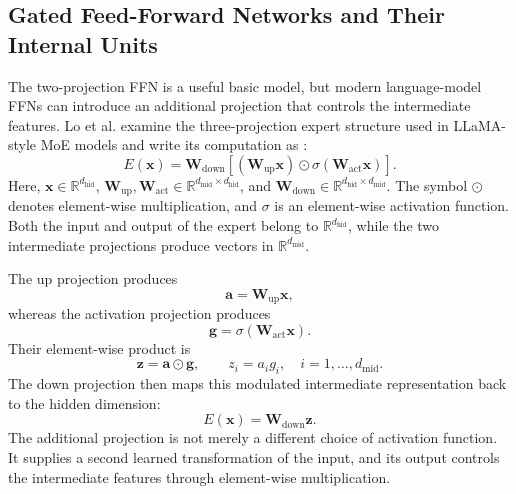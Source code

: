 \subsection{Gated Feed-Forward Networks and Their Internal Units}
\label{subsec:ffn-gated}

The two-projection FFN is a useful basic model, but modern language-model
FFNs can introduce an additional projection that controls the
intermediate features. Lo et al. examine the three-projection expert
structure used in LLaMA-style MoE models and write its computation as
\parencite{lo2025closer}:
\begin{equation}
    E(\mathbf{x})
    =
    \mathbf{W}_{\mathrm{down}}
    \left[
        \left(\mathbf{W}_{\mathrm{up}}\mathbf{x}\right)
        \odot
        \sigma\left(\mathbf{W}_{\mathrm{act}}\mathbf{x}\right)
    \right].
    \label{eq:ffn-gated}
\end{equation}
Here, \(\mathbf{x}\in\mathbb{R}^{d_{\mathrm{hid}}}\),
\(\mathbf{W}_{\mathrm{up}},\mathbf{W}_{\mathrm{act}}
\in\mathbb{R}^{d_{\mathrm{mid}}\times d_{\mathrm{hid}}}\), and
\(\mathbf{W}_{\mathrm{down}}
\in\mathbb{R}^{d_{\mathrm{hid}}\times d_{\mathrm{mid}}}\).
The symbol \(\odot\) denotes element-wise multiplication, and
\(\sigma\) is an element-wise activation function. Both the input and
output of the expert belong to \(\mathbb{R}^{d_{\mathrm{hid}}}\), while
the two intermediate projections produce vectors in
\(\mathbb{R}^{d_{\mathrm{mid}}}\).

The up projection produces
\begin{equation}
    \mathbf{a}
    =
    \mathbf{W}_{\mathrm{up}}\mathbf{x},
    \label{eq:ffn-gated-up}
\end{equation}
whereas the activation projection produces
\begin{equation}
    \mathbf{g}
    =
    \sigma\left(\mathbf{W}_{\mathrm{act}}\mathbf{x}\right).
    \label{eq:ffn-gated-control}
\end{equation}
Their element-wise product is
\begin{equation}
    \mathbf{z}
    =
    \mathbf{a}\odot\mathbf{g},
    \qquad
    z_i=a_i g_i,
    \quad i=1,\ldots,d_{\mathrm{mid}}.
    \label{eq:ffn-gated-product}
\end{equation}
The down projection then maps this modulated intermediate representation
back to the hidden dimension:
\begin{equation}
    E(\mathbf{x})
    =
    \mathbf{W}_{\mathrm{down}}\mathbf{z}.
    \label{eq:ffn-gated-down}
\end{equation}
The additional projection is not merely a different choice of activation
function. It supplies a second learned transformation of the input, and
its output controls the intermediate features through element-wise
multiplication.

